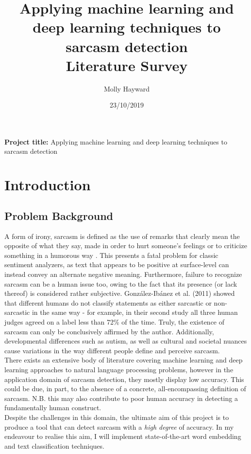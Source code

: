 \documentclass[12pt,a4paper]{article}
\title{
	Applying machine learning and deep learning techniques to sarcasm detection \\
	\large Literature Survey}
\author{Molly Hayward}
\date{23/10/2019}
\begin{document}
\maketitle
\begin{center}
	\textbf{Project title:} Applying machine learning and deep learning techniques to sarcasm detection
\end{center}


\section{Introduction}
\subsection{Problem Background}
\noindent A form of irony, sarcasm is defined as the use of remarks that clearly mean the opposite of what they say, made in order to hurt someone's feelings or to criticize something in a humorous way \cite{cambridge2019}. This presents a fatal problem for classic sentiment analyzers, as text that appears to be positive at surface-level can instead convey an alternate negative meaning. Furthermore, failure to recognize sarcasm can be a human issue too, owing to the fact that its presence (or lack thereof) is considered rather subjective. Gonz{\'a}lez-Ib{\'a}nez et al. (2011) \cite{gonzalez2011identifying} showed that different humans do not classify statements as either sarcastic or non-sarcastic in the same way - for example, in their second study all three human judges agreed on a label less than 72\% of the time. Truly, the existence of sarcasm can only be conclusively affirmed by the author. Additionally, developmental differences such as autism, as well as cultural and societal nuances cause variations in the way different people define and perceive sarcasm. \\

\noindent There exists an extensive body of literature covering machine learning and deep learning approaches to natural language processing problems, however in the application domain of sarcasm detection, they mostly display low accuracy. This could be due, in part, to the absence of a concrete, all-encompassing definition of sarcasm. N.B. this may also contribute to poor human accuracy in detecting a fundamentally human construct. \\

\noindent Despite the challenges in this domain, the ultimate aim of this project is to produce a tool that can detect sarcasm with a \textit{high degree} of accuracy. In my endeavour to realise this aim, I will implement state-of-the-art word embedding and text classification techniques.
\end{document}

